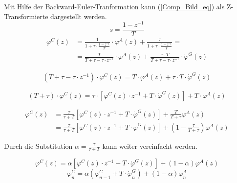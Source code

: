 Mit Hilfe der Backward-Euler-Tranformation kann (\ref{Comp_Bild_eq}) als Z-Transformierte dargestellt werden.
\begin{equation}
s = \frac{1 - z^{-1}}{T}
\end{equation}
\begin{equation}
\begin{split}
\varphi^C(z) & = \frac{1}{1 + \tau \cdot \frac{1 - z^{-1}}{T} } \cdot \varphi^A(z) + \frac{\tau}{1 + \tau \cdot \frac{1 - z^{-1}}{T}} = \\
& = \frac{T}{T + \tau - \tau \cdot z^{-1}} \cdot \varphi^A(z) + \frac{\tau \cdot T}{T + \tau - \tau \cdot z^{-1}} \cdot \dot{\varphi}^G(z)
\end{split}
\end{equation}

\begin{equation}
\begin{split}
(T + \tau - \tau \cdot z^{-1}) \cdot \varphi^C(z) = T \cdot \varphi^A(z) + \tau \cdot T \cdot \dot{\varphi}^G(z)
\end{split}
\end{equation}

\begin{equation}
(T + \tau) \cdot \varphi^C(z) = \tau \cdot [\varphi^C(z) \cdot z^{-1}  + T \cdot \dot{\varphi}^G(z)] + T \cdot \varphi^A(z)
\end{equation}

\begin{equation}
\begin{split}
\varphi^C(z) & = \frac{\tau}{\tau + T}[\varphi^C(z) \cdot z^{-1}  + T \cdot \dot{\varphi}^G(z)] + \frac{T}{T + \tau} \varphi^A(z) \\
& = \frac{\tau}{\tau + T}[\varphi^C(z) \cdot z^{-1}  + T \cdot \dot{\varphi}^G(z)] + (1 - \frac{\tau}{T + \tau}) \varphi^A(z)
\end{split}
\end{equation}

Durch die Substitution $\alpha = \frac{\tau}{\tau + T}$ kann weiter vereinfacht werden. 

\begin{equation}
\varphi^C(z)  = \alpha[\varphi^C(z) \cdot z^{-1}  + T \cdot \dot{\varphi}^G(z)] + (1 - \alpha) \varphi^A(z)
\end{equation}
\begin{equation}
\varphi^C_n = \alpha(\varphi^C_{n-1}  + T \cdot \dot{\varphi}^G_n) + (1 - \alpha) \varphi^A_n
\end{equation}

